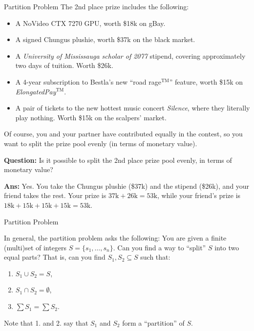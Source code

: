 \documentclass{beamer}
\begin{document}
\begin{frame}{Partition Problem}
The 2nd place prize includes the following: \pause
\begin{itemize}
    \item A NoVideo CTX 7270 GPU, worth \$18k on gBay. \pause
    \item A signed Chungus plushie, worth \$37k on the black market. \pause
    \item A \textit{University of Mississauga scholar of 2077} stipend, covering approximately two days of tuition. Worth \$26k. \pause
    \item A 4-year subscription to Bestla's new ``road rage$^{\text{TM}}$'' feature, worth \$15k on \textit{ElongatedPay}$^{\text{TM}}$. \pause
    \item A pair of tickets to the new hottest music concert \textit{Silence}, where they literally play nothing. Worth \$15k on the scalpers' market.
\end{itemize}

\pause

Of course, you and your partner have contributed equally in the contest, so you want to split the prize pool evenly (in terms of monetary value).

\vspace{2mm} \pause

\textbf{Question:} Is it possible to split the 2nd place prize pool evenly, in terms of monetary value? \pause

\textbf{Ans:} Yes. You take the Chungus plushie (\$37k) and the stipend (\$26k), and your friend takes the rest. Your prize is $37\text{k} + 26\text{k} = 53\text{k}$, while your friend's prize is $18\text{k} + 15\text{k} + 15\text{k} + 15\text{k} = 53\text{k}$.

\end{frame}

\begin{frame}{Partition Problem}

In general, the partition problem asks the following: \pause You are given a finite (multi)set of integers $S = \{s_1, \ldots, s_n\}$. Can you find a way to ``split'' $S$ into two equal parts? That is, can you find $S_1, S_2 \subseteq S$ such that:
\begin{enumerate}
    \item $S_1 \cup S_2 = S$,
    \item $S_1 \cap S_2 = \emptyset$,
    \item $\sum S_1 = \sum S_2$.
\end{enumerate}

\pause

Note that 1. and 2. say that $S_1$ and $S_2$ form a ``partition'' of $S$.

\end{frame}
\end{document}
